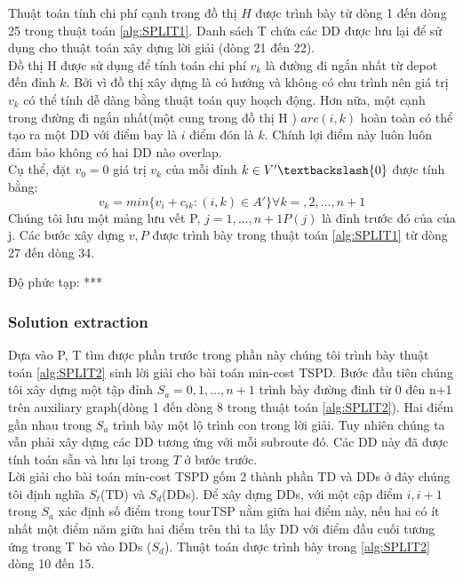 \documentclass[a4paper,12pt]{report}
\begin{document}
Thuật toán tính chi phí cạnh trong đồ thị $H$ được trình bày từ dòng 1 đến dòng 25 trong thuật toán \ref{alg:SPLIT1}. Danh sách T chứa các DD được lưu lại để sử dụng cho thuật toán xây dựng lời giải (dòng 21 đến 22). \\

Đồ thị H được sử dụng để tính toán chi phí $v_k$ là đường đi ngắn nhất từ depot đến đỉnh $k$. Bởi vì đồ thị xây dựng là có hướng và không có chu trình nên giá trị $v_k$ có thể tính dễ dàng bằng thuật toán quy hoạch động. Hơn nữa, một cạnh trong đường đi ngắn nhất(một cung trong đồ thị H ) $arc(i,k)$ hoàn toàn có thể tạo ra một DD với điểm bay là $i$ điểm đón là $k$. Chính lợi điểm này luôn luôn đảm bảo không có hai DD nào overlap.  \\

Cụ thể, đặt $v_0=0$ giá trị $v_k$ của mỗi đỉnh $k \in V'\textbackslash \{0\}$ được tính bằng: 
$$v_k=min\{v_i+c_{ik}:(i,k) \in A'\} \forall k=,2,\ldots,n+1$$
Chúng tôi lưu một mảng lưu vết P, $j=1,\ldots,n+1 P(j) $ là đỉnh trước đó của của j. Các bước xây dựng $v,P$ được trình bày trong thuật toán \ref{alg:SPLIT1} từ dòng 27 đến dòng 34. 

Độ phức tạp: *** \\

\subsubsection{Solution extraction} 

Dựa vào P, T tìm được phần trước trong phần này chúng tôi trình bày thuật toán \ref{alg:SPLIT2} sinh lời giải cho bài toán min-cost TSPD.  Bước đầu tiên chúng tôi xây dựng một tập đỉnh $S_a=0,1,\ldots,n+1$ trình bày đường đinh từ 0 đên n+1 trên auxiliary graph(dòng 1 đến dòng 8 trong thuật toán \ref{alg:SPLIT2}). Hai điểm gần nhau trong $S_a$ trình bày một lộ trình con trong lời giải. Tuy nhiên chúng ta vẫn phải xây dựng các DD tương ứng với mỗi subroute đó. Các DD này đã được tính toán sẵn và lưu lại trong $T$ ở bước trước. \\

Lời giải cho bài toán min-cost TSPD gốm 2 thành phần TD và DDs ở đây chúng tôi định nghĩa $S_t$(TD) và $S_d$(DDs). Để xây dựng DDs, với một cập điểm $i,i+1$ trong $S_a$ xác định số điểm trong tourTSP nằm giữa hai điểm này, nếu hai có ít nhất một điểm năm giữa hai điểm trên thì ta lấy DD với điểm đầu cuối tương ứng trong T bỏ vào DDs ($S_d$). Thuật toán dược trình bày trong \ref{alg:SPLIT2} dòng 10 đến 15.  \\
\end{document}
